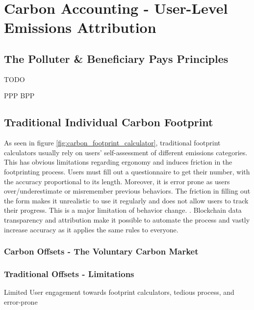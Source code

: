 \documentclass[11pt]{report}
\begin{document}
\section{Carbon Accounting - User-Level Emissions Attribution}

\subsection{The Polluter \& Beneficiary Pays Principles}

{\large{TODO}}

\ac{PPP} \ac{BPP}

\subsection{Traditional Individual Carbon Footprint \label{se:traditional_footprint}}

As seen in figure \ref{fig:carbon_footprint_calculator}, traditional footprint calculators usually rely on users' self-assessment of different emissions categories. This has obvious limitations regarding ergonomy and induces friction in the footprinting process. Users must fill out a questionnaire to get their number, with the accuracy proportional to its length. Moreover, it is error prone as users over/underestimate or misremember previous behaviors. The friction in filling out the form makes it unrealistic to use it regularly and does not allow users to track their progress. This is a major limitation of behavior change. . Blockchain data transparency and attribution make it possible to automate the process and vastly increase accuracy as it applies the same rules to everyone.

\subsubsection{Carbon Offsets - The Voluntary Carbon Market}
\subsubsection{Traditional Offsets - Limitations}


Limited User engagement towards footprint calculators, tedious process, and error-prone

\end{document}
